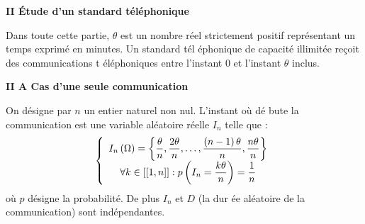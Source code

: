 \documentclass[a4paper, 11pt,reqno]{article}
\begin{document}
\textbf{II \'{E}tude d'un standard t\'{e}l\'{e}phonique }

Dans toute cette partie, $\theta $ est un nombre r\'{e}el strictement
positif repr\'{e}sentant un temps exprim\'{e} en minutes. Un standard t\'{e}l%
\'{e}phonique de capacit\'{e} illimit\'{e}e re\c{c}oit des communications t%
\'{e}l\'{e}phoniques entre l'instant 0 et l'instant $\theta $ inclus.

\textbf{II A Cas d'une seule communication}

On d\'{e}signe par $n$ un entier naturel non nul. L'instant o\`{u} d\'{e}%
bute la communication est une variable al\'{e}atoire r\'{e}elle $I_{n}$
telle que : 
\begin{equation*}
\left\{ 
\begin{array}{c}
\displaystyle I_{n}\left( \Omega \right) =\left\{ \frac{\theta }{n},\frac{%
2\theta }{n},\dots ,\frac{\left( n-1\right) \theta }{n},\frac{n\theta }{n}%
\right\} \\ 
\displaystyle \forall k\in \left[ \left[ 1,n\right] \right] :p\left( I_{n}=%
\frac{k\theta }{n}\right) =\frac{1}{n}%
\end{array}
\right.
\end{equation*}
o\`{u} $p$ d\'{e}signe la probabilit\'{e}. De plus $I_{n}$ et $D$ (la dur%
\'{e}e al\'{e}atoire de la communication) sont ind\'{e}pendantes.
\end{document}
